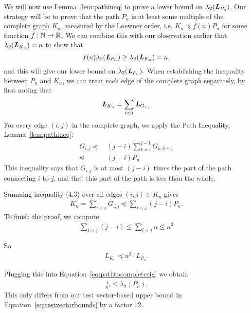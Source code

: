 We will now use Lemma~\ref{lem:pathineq} to prove a lower bound on $\lambda_2(\boldsymbol{\mathit{L}}_{P_n})$.
Our strategy will be to prove that the path $P_n$ is at least some multiple of the
complete graph $K_n$, measured by the Loewner order, i.e. $K_n \preceq
f(n) P_n$ for some function $f: \mathbb{N} \to \mathbb{R}$.
We can combine this with our observation earlier that $\lambda_2 (\boldsymbol{\mathit{L}}_{K_n}) = n$ to show that
\begin{align}
  \label{eq:pathtocompleteeig}
f(n) \lambda_2(\boldsymbol{\mathit{L}}_{P_n}) \geq \lambda_2(\boldsymbol{\mathit{L}}_{K_n}) = n,
\end{align}
and this will give our lower bound on $\lambda_2(\boldsymbol{\mathit{L}}_{P_n}).$
When establishing the inequality between $P_n$ and $K_n$, we can treat
each edge of the complete graph separately, by first noting that
\begin{align*}
\boldsymbol{\mathit{L}}_{K_n} = \sum_{i < j} \boldsymbol{\mathit{L}}_{G_{i,j}}
\end{align*}
For every edge $(i,j)$ in the complete graph, we apply the Path
Inequality, Lemma~\ref{lem:pathineq}:
\begin{align*}
  \label{eq:1}
G_{i,j}
\preceq & ~ (j-i) \sum_{k=i}^{j-1} G_{k,k+1} \\
\preceq & ~ (j-i) P_n
\end{align*}
This inequality says that $G_{i,j}$ is at most $(j-i)$ times the part of the path connecting $i$ to $j$, and that this part of the path is less than the whole.

Summing inequality (4.3) over all edges $(i,j) \in K_n$ gives
\begin{align*}
K_n = \sum_{i < j} G_{i,j} \preceq \sum_{i < j}  (j-i)P_n.
\end{align*}
To finish the proof, we compute
\begin{align*}
\sum_{i < j}  (j-i) \leq \sum_{i < j}  n \leq n^3
\end{align*}

So
\begin{align*}
L_{K_n} \preceq n^3 \cdot L_{P_n}.
\end{align*}

Plugging this into Equation~\eqref{eq:pathtocompleteeig}
we obtain
\begin{align*}
\frac{1}{ n^2 } \leq \lambda_2 (P_n).
\end{align*}
This only differs from our test vector-based upper bound in
Equation~\eqref{eq:testvectorbounds} by a factor 12.

